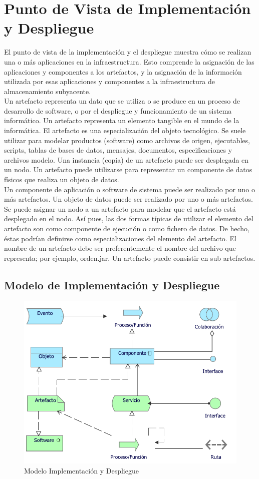 \section{Punto de Vista de Implementación y Despliegue}

El punto de vista de la implementación y el despliegue muestra cómo se realizan una o más aplicaciones en la infraestructura. Esto comprende la asignación de las aplicaciones y componentes a los artefactos, y la asignación de la información utilizada por esas aplicaciones y componentes a la infraestructura de almacenamiento subyacente.\\

Un artefacto representa un dato que se utiliza o se produce en un proceso de desarrollo de software, o por el despliegue y funcionamiento de un sistema informático. Un artefacto representa un elemento tangible en el mundo de la informática. El artefacto es una especialización del objeto tecnológico. Se suele utilizar para modelar productos (software) como archivos de origen, ejecutables, scripts, tablas de bases de datos, mensajes, documentos, especificaciones y archivos modelo. Una instancia (copia) de un artefacto puede ser desplegada en un nodo. Un artefacto puede utilizarse para representar un componente de datos físicos que realiza un objeto de datos.\\

Un componente de aplicación o software de sistema puede ser realizado por uno o más artefactos. Un objeto de datos puede ser realizado por uno o más artefactos. Se puede asignar un nodo a un artefacto para modelar que el artefacto está desplegado en el nodo. Así pues, las dos formas típicas de utilizar el elemento del artefacto son como componente de ejecución o como fichero de datos. De hecho, éstas podrían definirse como especializaciones del elemento del artefacto.
El nombre de un artefacto debe ser preferentemente el nombre del archivo que representa; por ejemplo, orden.jar. Un artefacto puede consistir en sub artefactos.

\clearpage

\subsection{Modelo de Implementación y Despliegue}
\begin{figure}[h!]
	\centering
	\includegraphics[width=.7\linewidth]{imgs/modelo/Implementacion}
	\caption{Modelo Implementación y Despliegue}
\end{figure}

